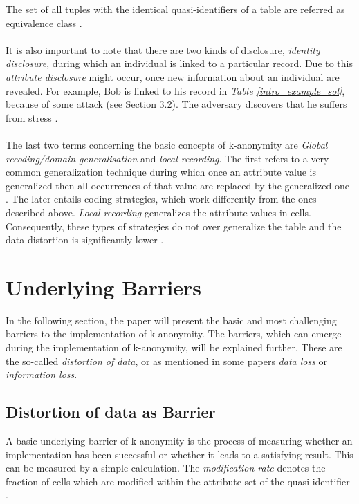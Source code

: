 \documentclass{llncs}
\begin{document}
The set of all tuples with the identical quasi-identifiers of a table are referred as equivalence class \cite{li2006achieving}.\\ \\
It is also important to note that there are two kinds of disclosure, \textit{ identity disclosure}, during which an individual is linked to a particular record. Due to this \textit{attribute disclosure} might occur, once new information about an individual are revealed. For example, Bob is linked to his record in \textit{Table \ref{intro_example_sol}}, because of some attack (see Section 3.2). The adversary discovers that he suffers from stress \cite{sweeney2002k}.\\\\
The last two terms concerning the basic concepts of k-anonymity are \textit{Global recoding/domain generalisation} and \textit{local recording}. The first refers to a very common generalization technique during which once an attribute value is generalized then all occurrences of that value are replaced by the generalized one  \cite{sweeney2002k,sweeney2002achieving,li2006achieving,incognito}. The later entails coding strategies, which work differently from the ones described above. \textit{Local recording} generalizes the attribute values in cells. Consequently, these types of strategies do not over generalize the table and the data distortion is significantly lower \cite{li2006achieving}. 
 
\section{Underlying Barriers}

In the following section, the paper will present the basic and most challenging barriers to the implementation of k-anonymity. The barriers, which can emerge during the implementation of k-anonymity, will be explained further. These are the so-called \textit{distortion of data}, or as mentioned in some papers \textit{data loss} or \textit{information loss}. 
\subsection{Distortion of data as Barrier} \label{sec:Distortion of data as Barrier}

A basic underlying barrier of k-anonymity is the process of measuring whether an implementation has been successful or whether it leads to a satisfying result. This can be measured by a simple calculation. The \textit{modification rate} denotes the fraction of cells which are modified within the attribute set of the quasi-identifier \cite{li2006achieving}.
\end{document}
